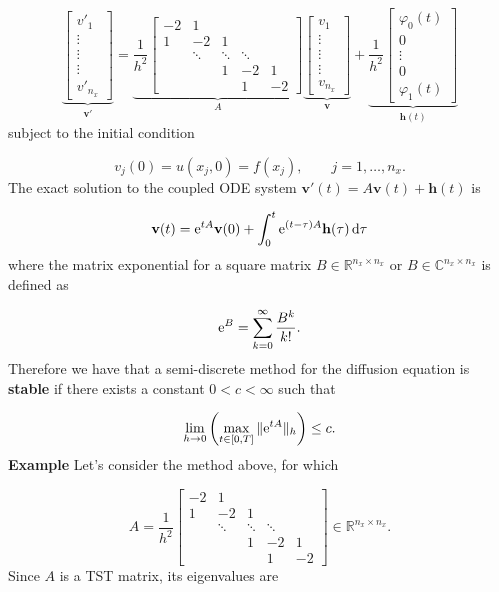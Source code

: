 \documentclass[12pt,landscape]{article}
\begin{document}
{\[
\underbrace{\begin{bmatrix}
v'_{1} \\
\vdots \\
\vdots \\
\vdots \\
v'_{n_x}
\end{bmatrix}}_{\mathbf{v}'} = 
\underbrace{\frac{1}{h^2}\begin{bmatrix}
- 2 & 1 & & & \\
1  & -2 & 1  & & \\
      & \ddots & \ddots & \ddots & \\
      &        & 1    & -2 & 1 \\
      &        &        & 1 & -2
\end{bmatrix}}_{A}
\underbrace{\begin{bmatrix}
v_{1} \\
\vdots \\
\vdots \\
\vdots \\
v_{n_x}
\end{bmatrix}}_{\mathbf{v}}
+ 
\underbrace{\frac{1}{h^2}\begin{bmatrix}
\varphi_0(t) \\
0 \\
\vdots \\
0 \\
 \varphi_1(t)
\end{bmatrix}}_{\mathbf{h}(t)}
\]
subject to the initial condition

\[
v_j(0) = u(x_j,0) = f(x_j), \qquad j = 1, \ldots, n_x.
\]
The exact solution to the coupled ODE system $\mathbf{v}'(t) = A\mathbf{v}(t) + \mathbf{h}(t)$ is

\[
\mathbf{v}(t) = {\rm e}^{tA}\mathbf{v}(0) + \int_0^t {\rm e}^{(t - \tau)A}\mathbf{h}(\tau)\,{\rm d}\tau
\]
where the matrix exponential for a square matrix $B \in \mathbb{R}^{n_x \times n_x}$ or $B \in \mathbb{C}^{n_x \times n_x}$ is defined as

\[
    {\rm e}^{B} = \sum_{k=0}^{\infty}\frac{B^k}{k!}.
\]
Therefore we have that a semi-discrete method for the diffusion equation is \textbf{stable} if there exists a constant $0 <c < \infty$ such that

\[
\lim_{h \to 0}\left(\max_{t \in [0, T]}\| {\rm e}^{tA}\|_h \right) \leq c.
\]
\textbf{Example} Let's consider the method above, for which 

\[
A = \frac{1}{h^2}\begin{bmatrix}
- 2 & 1 & & & \\
1  & -2 & 1  & & \\
      & \ddots & \ddots & \ddots & \\
      &        & 1    & -2 & 1 \\
      &        &        & 1 & -2
\end{bmatrix} \in \mathbb{R}^{n_x \times n_x}.
\]
Since $A$ is a TST matrix, its eigenvalues are

}
\end{document}
